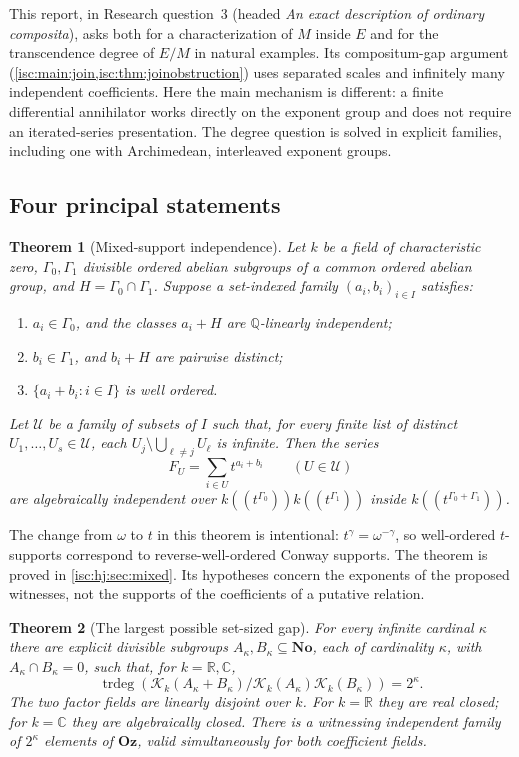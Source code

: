 \documentclass[11pt,letterpaper]{article}
\newtheorem{mainthm}{Theorem}
\theoremstyle{definition}
\theoremstyle{remark}
\newcommand{\No}{\mathbf{No}}
\newcommand{\Oz}{\mathbf{Oz}}
\newcommand{\R}{\mathbb R}
\newcommand{\C}{\mathbb C}
\newcommand{\Q}{\mathbb Q}
\newcommand{\K}[2]{\mathcal K_{#1}(#2)}
\newcommand{\trdeg}{\operatorname{trdeg}}
\numberwithin{equation}{section}
\begin{document}
This report, in Research question~3 (headed \emph{An exact description of
ordinary composita}), asks both for a characterization of $M$ inside $E$
and for the transcendence degree of $E/M$ in natural examples. Its
compositum-gap argument (\cref{isc:main:join,isc:thm:joinobstruction}) uses
separated scales and infinitely many independent coefficients. Here the
main mechanism is different: a finite differential annihilator works
directly on the exponent group and does not require an iterated-series
presentation. The degree question is solved in explicit families, including
one with Archimedean, interleaved exponent groups.

\subsection{Four principal statements}

\begin{mainthm}[Mixed-support independence]\label{isc:hj:main:mixed}
Let $k$ be a field of characteristic zero, $\Gamma_0,\Gamma_1$ divisible
ordered abelian subgroups of a common ordered abelian group, and
$H=\Gamma_0\cap\Gamma_1$. Suppose a set-indexed family
$(a_i,b_i)_{i\in I}$ satisfies:
\begin{enumerate}[label=\textup{(\roman*)}]
\item $a_i\in\Gamma_0$, and the classes $a_i+H$ are
$\Q$-linearly independent;
\item $b_i\in\Gamma_1$, and $b_i+H$ are pairwise distinct;
\item $\{a_i+b_i:i\in I\}$ is well ordered.
\end{enumerate}
Let $\mathcal U$ be a family of subsets of $I$ such that, for every finite
list of distinct $U_1,\ldots,U_s\in\mathcal U$, each
$U_j\setminus\bigcup_{\ell\ne j}U_\ell$ is infinite. Then the series
\[
 F_U=\sum_{i\in U}t^{a_i+b_i}\qquad(U\in\mathcal U)
\]
are algebraically independent over
$k((t^{\Gamma_0}))k((t^{\Gamma_1}))$ inside
$k((t^{\Gamma_0+\Gamma_1}))$.
\end{mainthm}

The change from $\omega$ to $t$ in this theorem is intentional:
$t^\gamma=\omega^{-\gamma}$, so well-ordered $t$-supports correspond to
reverse-well-ordered Conway supports. The theorem is proved in
\cref{isc:hj:sec:mixed}. Its hypotheses concern the exponents of the
proposed witnesses, not the supports of the coefficients of a putative
relation.

\begin{mainthm}[The largest possible set-sized gap]\label{isc:hj:main:cardinal}
For every infinite cardinal $\kappa$ there are explicit divisible
subgroups $A_\kappa,B_\kappa\subseteq\No$, each of cardinality $\kappa$,
with $A_\kappa\cap B_\kappa=0$, such that, for $k=\R,\C$,
\[
 \trdeg\!\left(
 \K{k}{A_\kappa+B_\kappa}
 \big/
 \K{k}{A_\kappa}\K{k}{B_\kappa}
 \right)=2^\kappa.
\]
The two factor fields are linearly disjoint over $k$. For $k=\R$ they
are real closed; for $k=\C$ they are algebraically closed. There is a
witnessing independent family of $2^\kappa$ elements of $\Oz$, valid
simultaneously for both coefficient fields.
\end{mainthm}
\end{document}
